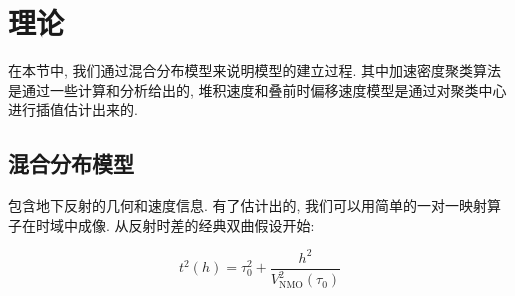 \section{理论}
在本节中, 我们通过混合分布模型来说明模型的建立过程. 其中加速密度聚类算法是通过一些计算和分析给出的, 堆积速度和叠前时偏移速度模型是通过对聚类中心进行插值估计出来的. 
\subsection{混合分布模型}
包含地下反射的几何和速度信息. 有了估计出的, 我们可以用简单的一对一映射算子在时域中成像. 从反射时差的经典双曲假设开始: 

\begin{equation}
    t^2(h)=\tau_0^2+\frac{h^2}{V_{\mathrm{NMO}}^2(\tau_0)}
\end{equation}

